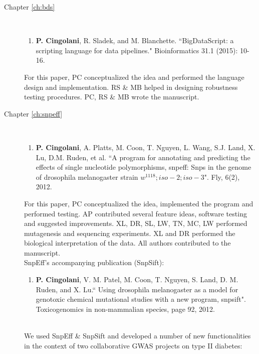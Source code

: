 \begin{description}
	
	\item[Chapter \ref{ch:bds}] ~ 
	
		\begin{enumerate}
			\item \textbf{P. Cingolani}, R. Sladek, and M. Blanchette. ``BigDataScript: a scripting language for data pipelines." Bioinformatics 31.1 (2015): 10-16.
		\end{enumerate}

		For this paper, PC conceptualized the idea and performed the language design and implementation. RS \& MB helped in designing robustness testing procedures. PC, RS \& MB wrote the manuscript.
		\\
	
	\item[Chapter \ref{ch:snpeff}] ~
	
		\begin{enumerate}[resume]
			\item \textbf{P. Cingolani}, A. Platts, M. Coon, T. Nguyen, L. Wang, S.J. Land, X. Lu, D.M. Ruden, et al. ``A program for annotating and predicting the effects of single nucleotide polymorphisms, snpeff: Snps in the genome of drosophila melanogaster strain $w^{1118}; iso-2; iso-3$". Fly, 6(2), 2012.
		\end{enumerate}

		For this paper, PC conceptualized the idea, implemented the program and performed testing.
		AP contributed several feature ideas, software testing and suggested improvements.
		XL, DR, SL, LW, TN, MC, LW performed mutagenesis and sequencing experiments.
		XL and DR performed the biological interpretation of the data.
		All authors contributed to the manuscript.
		\\

		SnpEff's accompanying publication (SnpSift):
	
		\begin{enumerate}[resume]		
			\item \textbf{P. Cingolani}, V. M. Patel, M. Coon, T. Nguyen, S. Land, D. M. Ruden, and X. Lu.`` Using drosophila melanogaster as a model for genotoxic chemical mutational studies with a new program, snpsift". Toxicogenomics in non-mammalian species, page 92, 2012.
		\end{enumerate}
		
		~ \\

		We used SnpEff \& SnpSift and developed a number of new functionalities in the context of two collaborative GWAS projects on type II diabetes:


\end{description}
